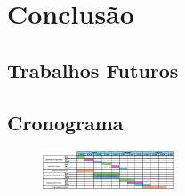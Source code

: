 \documentclass[
	12pt,				%
	openright,			%
	oneside,			%
	a4paper,			%
	english,			%
	brazil				%
	]{abntex2}
\begin{document}
\chapter{Conclusão}
\section{Trabalhos Futuros}

\postextual



\begin{apendicesenv}

\partapendices

\chapter{\label{AnexoA} Cronograma}
\begin{figure}[h]
    \centering
    \includegraphics[angle=90, width=0.35\textwidth]{../Imgs/Cronograma.jpg}
\end{figure}

\end{apendicesenv}
\end{document}
